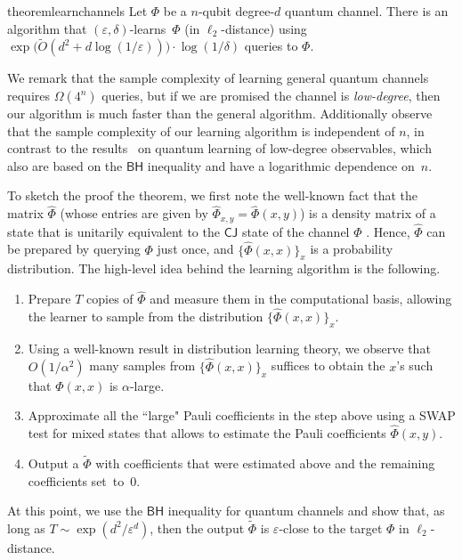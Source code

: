 \documentclass[11pt]{article}
\newcommand{\BH}{\textsf{BH}}
\newcommand{\CJ}{\textsf{CJ}}
\theoremstyle{plain}
\theoremstyle{plain}
\theoremstyle{definition}
\theoremstyle{remark}
\theoremstyle{named}
\begin{document}
\begin{restatable}{theorem}{learnchannels}\label{theo:learnchannels}
    Let $\Phi$ be a $n$-qubit degree-$d$ quantum channel. There is an algorithm that $(\varepsilon,
    \delta)$-learns~$\Phi$ (in $\ell_2$-distance)
    using 
    $ 
    \exp\big(\widetilde{O}(d^2+d\log (1/\varepsilon))\big)\cdot \log(1/\delta) 
    $ queries  
    to $\Phi$.
\end{restatable}

We remark that the sample complexity of learning general quantum channels requires $\Omega(4^n)$ queries, but if we are promised the channel is \emph{low-degree}, then our  algorithm is much faster than the general algorithm. Additionally  observe that the sample complexity of our learning algorithm is independent of $n$, in contrast to the results~\cite{huang2022learning, volberg2023noncommutative,slote2023bohnenblust,slote2023noncommutative,klein_et_al:LIPIcs.ITCS.2024.69} on quantum learning of low-degree observables, which also are based   on the $\BH$ inequality and have a logarithmic dependence on~$n$.

To sketch the proof the theorem, we first note the  well-known fact that the matrix $\widehat\Phi$ (whose entries are given by $\widehat{\Phi}_{x,y}=\widehat{\Phi}(x,y)$) is a density matrix of a state that is unitarily equivalent to the $\CJ$ state of the channel $\Phi$ \cite[Lemma 8]{bao2023nearly}. Hence, $\widehat\Phi$ can be prepared by querying $\Phi$ just once, and $\{\widehat\Phi(x,x)\}_{x}$ is a probability distribution. The high-level idea behind the learning algorithm is the following.
\begin{enumerate}
    \item Prepare $T$ copies of $\widehat\Phi$ and measure them in the computational basis, allowing the learner to sample from  the distribution $\{\widehat\Phi(x,x)\}_x$.
    \item Using a well-known result in distribution learning theory, we observe that $O(1/\alpha^2)$ many samples from $\{\widehat\Phi(x,x)\}_x$ suffices to obtain the $x$'s such that $\Phi(x,x)$ is $\alpha$-large.
    \item Approximate all the ``large" Pauli coefficients in the step above using a SWAP test for mixed states that allows to estimate the Pauli coefficients $\widehat\Phi(x,y)$. 
    \item Output a $\widetilde{\Phi}$ with coefficients that were estimated above and the remaining coefficients set~to~$0$.
\end{enumerate}
At this point, we use the $\BH$ inequality for quantum channels and show that, as long as $T\sim \exp(d^{2}/\varepsilon^d)$, then the output $\widetilde{\Phi}$ is $\varepsilon$-close to the target $\Phi$ in $\ell_2$-distance.
\end{document}
